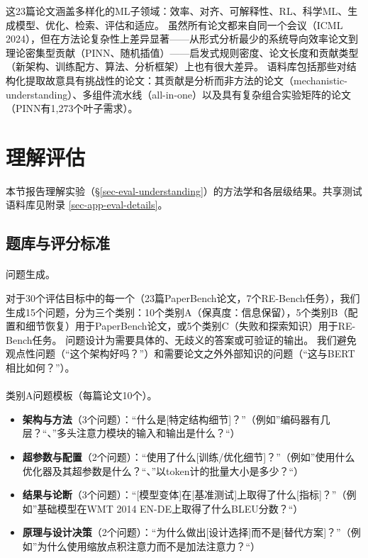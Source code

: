 \documentclass[
]{article}
\makeatletter
\let\oldparagraph\paragraph
\renewcommand{\paragraph}{
    \@ifstar
      \xxxParagraphStar
      \xxxParagraphNoStar
  }
\newcommand{\xxxParagraphStar}[1]{\oldparagraph*{#1}\mbox{}}
\newcommand{\xxxParagraphNoStar}[1]{\oldparagraph{#1}\mbox{}}
\providecommand{\tightlist}{%
  \setlength{\itemsep}{0pt}\setlength{\parskip}{0pt}}
\theoremstyle{definition}
\makeatother
\begin{document}
这23篇论文涵盖多样化的ML子领域：效率、对齐、可解释性、RL、科学ML、生成模型、优化、检索、评估和适应。
虽然所有论文都来自同一个会议（ICML
2024），但在方法论复杂性上差异显著------从形式分析最少的系统导向效率论文到理论密集型贡献（PINN、随机插值）------启发式规则密度、论文长度和贡献类型（新架构、训练配方、算法、分析框架）上也有很大差异。
语料库包括那些对结构化提取故意具有挑战性的论文：其贡献是分析而非方法的论文（mechanistic-understanding）、多组件流水线（all-in-one）以及具有复杂组合实验矩阵的论文（PINN有1,273个叶子需求）。

\section{理解评估}\label{sec-app-understanding-eval}

本节报告理解实验（\S\ref{sec-eval-understanding}）的方法学和各层级结果。共享测试语料库见附录
\ref{sec-app-eval-details}。

\subsection{题库与评分标准}\label{sec-app-question-bank}

\paragraph{问题生成。}\label{ux95eeux9898ux751fux6210}

对于30个评估目标中的每一个（23篇PaperBench论文，7个RE-Bench任务），我们生成15个问题，分为三个类别：10个类别A（保真度：信息保留），5个类别B（配置和细节恢复）用于PaperBench论文，或5个类别C（失败和探索知识）用于RE-Bench任务。
问题设计为需要具体的、无歧义的答案或可验证的输出。
我们避免观点性问题（``这个架构好吗？''）和需要论文之外外部知识的问题（``这与BERT相比如何？''）。

\paragraph{类别A问题模板（每篇论文10个）。}\label{ux7c7bux522baux95eeux9898ux6a21ux677fux6bcfux7bc7ux8bbaux658710ux4e2a}

\begin{itemize}
\tightlist
\item
  \textbf{架构与方法}（3个问题）：``什么是{[}特定结构细节{]}？''（例如''编码器有几层？``、''多头注意力模块的输入和输出是什么？``）
\item
  \textbf{超参数与配置}（2个问题）：``使用了什么{[}训练/优化细节{]}？''（例如''使用什么优化器及其超参数是什么？``、''以token计的批量大小是多少？``）
\item
  \textbf{结果与论断}（3个问题）：``{[}模型变体{]}在{[}基准测试{]}上取得了什么{[}指标{]}？''（例如''基础模型在WMT
  2014 EN-DE上取得了什么BLEU分数？``）
\item
  \textbf{原理与设计决策}（2个问题）：``为什么做出{[}设计选择{]}而不是{[}替代方案{]}？''（例如''为什么使用缩放点积注意力而不是加法注意力？``）
\end{itemize}
\end{document}
